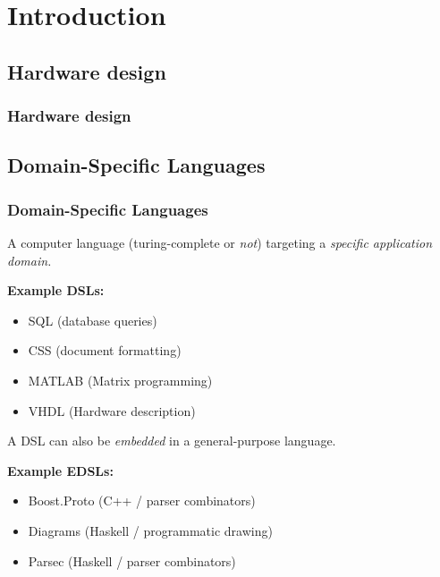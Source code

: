 \section{Introduction}
\label{sec:introduction}
    \frame{\sectionpage}

    \subsection{Hardware design}
    \label{subsec:hardware-design}
        \begin{frame}
            \frametitle{Hardware design}
        \end{frame}


    \subsection{Domain-Specific Languages}
    \label{subsec:domain-specific-languages}
        \begin{frame}
            \frametitle{Domain-Specific Languages}

            \par{A computer language (turing-complete or \emph{not}) targeting a \emph{specific application domain.}}
            \par{\textbf{Example DSLs:}}
            \begin{itemize}
                \item SQL (database queries)
                \item CSS (document formatting)
                \item MATLAB (Matrix programming)
                \item VHDL (Hardware description)
            \end{itemize}

            \pause

            \par{A DSL can also be \emph{embedded} in a general-purpose language.}
            \par{\textbf{Example EDSLs:}}
            \begin{itemize}
                \item Boost.Proto (C++ / parser combinators)
                \item Diagrams (Haskell / programmatic drawing)
                \item Parsec (Haskell / parser combinators)
            \end{itemize}
        \end{frame}

